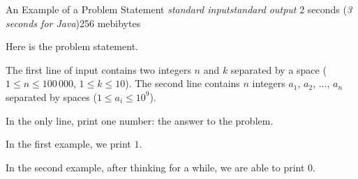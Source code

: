 \begin{problem}{An Example of a Problem Statement}
{\textsl{standard input}}{\textsl{standard output}}
{2 seconds (\textsl{3 seconds for Java})}{256 mebibytes}{}

Here is the problem statement.

\InputFile

The first line of input contains two integers $n$ and $k$ separated by a space
($1 \le n \le 100\,000$, $1 \le k \le 10$).
The second line contains $n$ integers
$a_1$, $a_2$, $\ldots$, $a_n$ separated by spaces
($1 \le a_i \le 10^9$).

\OutputFile

In the only line, print one number: the answer to the problem.

\Examples

\begin{example}
%
%
\end{example}

\Explanations

In the first example, we print $1$.

In the second example, after thinking for a while, we are able to print $0$.

\end{problem}

